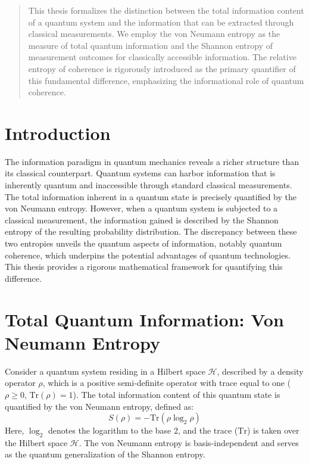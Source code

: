 	
	
	\begin{abstract}
		This thesis formalizes the distinction between the total information content of a quantum system and the information that can be extracted through classical measurements. We employ the von Neumann entropy as the measure of total quantum information and the Shannon entropy of measurement outcomes for classically accessible information. The relative entropy of coherence is rigorously introduced as the primary quantifier of this fundamental difference, emphasizing the informational role of quantum coherence.
	\end{abstract}
	
	\section{Introduction}
	
	The information paradigm in quantum mechanics reveals a richer structure than its classical counterpart. Quantum systems can harbor information that is inherently quantum and inaccessible through standard classical measurements. The total information inherent in a quantum state is precisely quantified by the von Neumann entropy. However, when a quantum system is subjected to a classical measurement, the information gained is described by the Shannon entropy of the resulting probability distribution. The discrepancy between these two entropies unveils the quantum aspects of information, notably quantum coherence, which underpins the potential advantages of quantum technologies. This thesis provides a rigorous mathematical framework for quantifying this difference.
	
	\section{Total Quantum Information: Von Neumann Entropy}
	
	Consider a quantum system residing in a Hilbert space $\mathcal{H}$, described by a density operator $\rho$, which is a positive semi-definite operator with trace equal to one ($\rho \ge 0$, $\text{Tr}(\rho) = 1$). The total information content of this quantum state is quantified by the von Neumann entropy, defined as:
	\begin{equation}
		S(\rho) = -\text{Tr}(\rho \log_2 \rho)
		\label{eq:von_neumann_entropy}
	\end{equation}
	Here, $\log_2$ denotes the logarithm to the base 2, and the trace ($\text{Tr}$) is taken over the Hilbert space $\mathcal{H}$. The von Neumann entropy is basis-independent and serves as the quantum generalization of the Shannon entropy.
	
